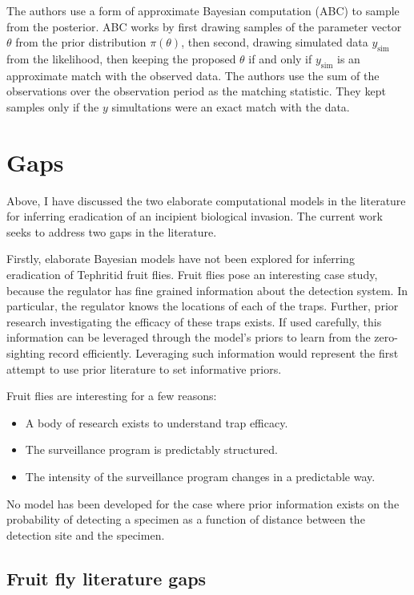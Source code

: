 \documentclass[
]{book}
\providecommand{\tightlist}{%
  \setlength{\itemsep}{0pt}\setlength{\parskip}{0pt}}
\begin{document}
The authors use a form of approximate Bayesian computation (ABC) to sample from the posterior. ABC works by first drawing samples of the parameter vector \(\theta\) from the prior distribution \(\pi(\theta)\), then second, drawing simulated data \(y_{\text{sim}}\) from the likelihood, then keeping the proposed \(\theta\) if and only if \(y_{\text{sim}}\) is an approximate match with the observed data. The authors use the sum of the observations over the observation period as the matching statistic. They kept samples only if the \(y\) simultations were an exact match with the data.

\hypertarget{gaps}{%
\section{Gaps}\label{gaps}}

Above, I have discussed the two elaborate computational models in the literature for inferring eradication of an incipient biological invasion. The current work seeks to address two gaps in the literature.

Firstly, elaborate Bayesian models have not been explored for inferring eradication of Tephritid fruit flies. Fruit flies pose an interesting case study, because the regulator has fine grained information about the detection system. In particular, the regulator knows the locations of each of the traps. Further, prior research investigating the efficacy of these traps exists. If used carefully, this information can be leveraged through the model's priors to learn from the zero-sighting record efficiently. Leveraging such information would represent the first attempt to use prior literature to set informative priors.

Fruit flies are interesting for a few reasons:

\begin{itemize}
\tightlist
\item
  A body of research exists to understand trap efficacy.
\item
  The surveillance program is predictably structured.
\item
  The intensity of the surveillance program changes in a predictable way.
\end{itemize}

No model has been developed for the case where prior information exists on the probability of detecting a specimen as a function of distance between the detection site and the specimen.

\hypertarget{fruit-fly-literature-gaps}{%
\subsection{Fruit fly literature gaps}\label{fruit-fly-literature-gaps}}
\end{document}
